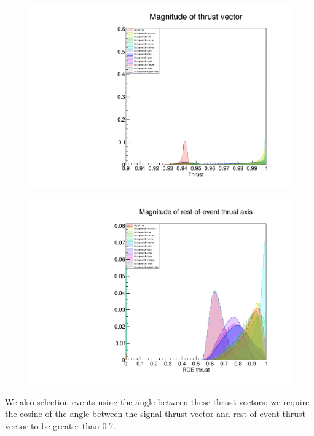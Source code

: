\documentclass[12pt]{thesis}  %
\begin{document}
\begin{figure}[h]
\centering
\begin{minipage}{.5\textwidth}
  \centering
  \includegraphics[width=\linewidth]{images/tauMG-thrustSignal.pdf}
  \label{fig:test1}
\end{minipage}%
\begin{minipage}{.5\textwidth}
  \centering
  \includegraphics[width=\linewidth]{images/tauMG-thrustRoe.pdf}
  \label{fig:test2}
\end{minipage}
\end{figure}


We also selection events using the angle between these thrust vectors; we require the cosine of the angle between the signal thrust vector and rest-of-event thrust vector to be greater than \num{0.7}.
\end{document}
